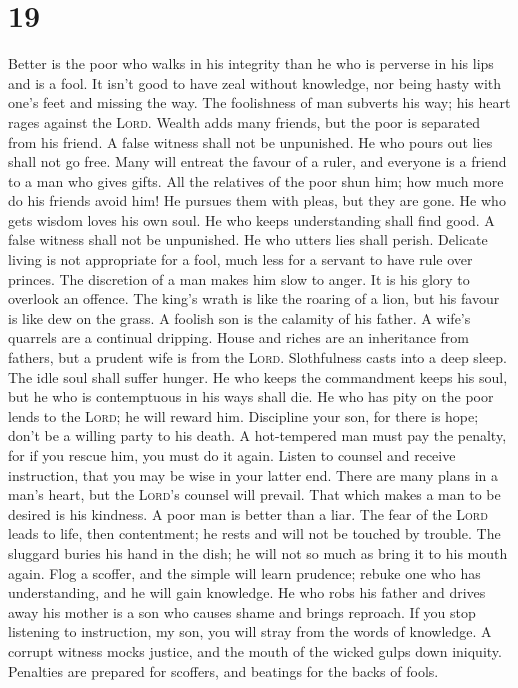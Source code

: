 \hypertarget{section-18}{%
\section{19}\label{section-18}}

 Better is the poor who walks in his integrity than he who
is perverse in his lips and is a fool.  It isn't good to
have zeal without knowledge, nor being hasty with one's feet and missing
the way.  The foolishness of man subverts his way; his
heart rages against the \textsc{Lord}.  Wealth adds many
friends, but the poor is separated from his friend.  A
false witness shall not be unpunished. He who pours out lies shall not
go free.  Many will entreat the favour of a ruler, and
everyone is a friend to a man who gives gifts.  All the
relatives of the poor shun him; how much more do his friends avoid him!
He pursues them with pleas, but they are gone.  He who
gets wisdom loves his own soul. He who keeps understanding shall find
good.  A false witness shall not be unpunished. He who
utters lies shall perish.  Delicate living is not
appropriate for a fool, much less for a servant to have rule over
princes.  The discretion of a man makes him slow to
anger. It is his glory to overlook an offence.  The
king's wrath is like the roaring of a lion, but his favour is like dew
on the grass.  A foolish son is the calamity of his
father. A wife's quarrels are a continual dripping. 
House and riches are an inheritance from fathers, but a prudent wife is
from the \textsc{Lord}.  Slothfulness casts into a deep
sleep. The idle soul shall suffer hunger.  He who keeps
the commandment keeps his soul, but he who is contemptuous in his ways
shall die.  He who has pity on the poor lends to the
\textsc{Lord}; he will reward him.  Discipline your son,
for there is hope; don't be a willing party to his death.
 A hot-tempered man must pay the penalty, for if you
rescue him, you must do it again.  Listen to counsel and
receive instruction, that you may be wise in your latter end.
 There are many plans in a man's heart, but the
\textsc{Lord}'s counsel will prevail.  That which makes a
man to be desired is his kindness. A poor man is better than a liar.
 The fear of the \textsc{Lord} leads to life, then
contentment; he rests and will not be touched by trouble.
 The sluggard buries his hand in the dish; he will not so
much as bring it to his mouth again.  Flog a scoffer, and
the simple will learn prudence; rebuke one who has understanding, and he
will gain knowledge.  He who robs his father and drives
away his mother is a son who causes shame and brings reproach.
 If you stop listening to instruction, my son, you will
stray from the words of knowledge.  A corrupt witness
mocks justice, and the mouth of the wicked gulps down iniquity.
 Penalties are prepared for scoffers, and beatings for
the backs of fools.

